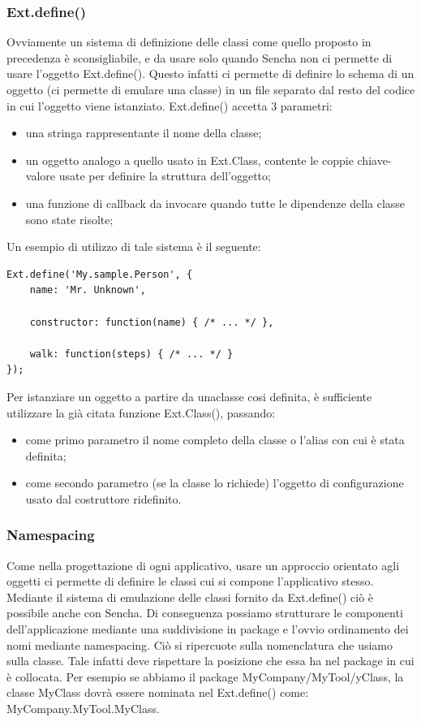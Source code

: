 \documentclass[10pt,a4paper,onecolumn]{article}
\begin{document}
\subsubsection{Ext.define()}
Ovviamente un sistema di definizione delle classi come quello proposto in precedenza è sconsigliabile, e da usare solo quando Sencha non ci permette di usare l'oggetto Ext.define(). Questo infatti ci permette di definire lo schema di un oggetto (ci permette di emulare una classe) in un file separato dal resto del codice in cui l'oggetto viene istanziato. Ext.define() accetta 3 parametri:

\begin{itemize}
	\item una stringa rappresentante il nome della classe;
	\item un oggetto analogo a quello usato in Ext.Class, contente le coppie chiave-valore usate per definire la struttura dell'oggetto;
	\item una funzione di callback da invocare quando tutte le dipendenze della classe sono state risolte;
\end{itemize}

Un esempio di utilizzo di tale sistema è il seguente:

\begin{lstlisting}
Ext.define('My.sample.Person', {
    name: 'Mr. Unknown',
 
    constructor: function(name) { /* ... */ },
 
    walk: function(steps) { /* ... */ }
});
\end{lstlisting}

Per istanziare un oggetto a partire da unaclasse cosi definita, è sufficiente utilizzare la già citata funzione Ext.Class(), passando:
\begin{itemize}
	\item come primo parametro il nome completo della classe o l'alias con cui è stata definita;
	\item come secondo parametro (se la classe lo richiede) l'oggetto di configurazione usato dal costruttore ridefinito.
\end{itemize}

\subsubsection{Namespacing}
Come nella progettazione di ogni applicativo, usare un approccio orientato agli oggetti ci permette di definire le classi cui si compone l'applicativo stesso. Mediante il sistema di emulazione delle classi fornito da Ext.define() ciò è possibile anche con Sencha. Di conseguenza possiamo strutturare le componenti dell'applicazione mediante una suddivisione in package e l'ovvio ordinamento dei nomi mediante namespacing. Ciò si ripercuote sulla nomenclatura che usiamo sulla classe. Tale infatti deve rispettare la posizione che essa ha nel package in cui è collocata. Per esempio se abbiamo il package MyCompany/MyTool/yClass, la classe MyClass dovrà essere nominata nel Ext.define() come: MyCompany.MyTool.MyClass.
\end{document}
